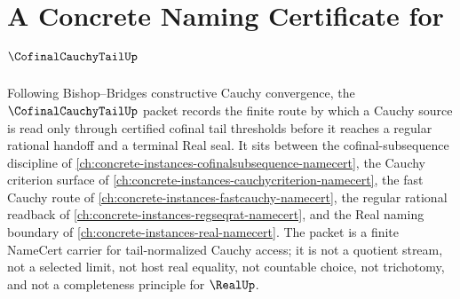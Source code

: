 \chapter{A Concrete Naming Certificate for $\CofinalCauchyTailUp$}
\label{ch:concrete-instances-cofinalcauchytail-namecert}

Following Bishop--Bridges constructive Cauchy convergence, the $\CofinalCauchyTailUp$ packet records the finite route by which a Cauchy source is read only through certified cofinal tail thresholds before it reaches a regular rational handoff and a terminal Real seal. It sits between the cofinal-subsequence discipline of \autoref{ch:concrete-instances-cofinalsubsequence-namecert}, the Cauchy criterion surface of \autoref{ch:concrete-instances-cauchycriterion-namecert}, the fast Cauchy route of \autoref{ch:concrete-instances-fastcauchy-namecert}, the regular rational readback of \autoref{ch:concrete-instances-regseqrat-namecert}, and the Real naming boundary of \autoref{ch:concrete-instances-real-namecert}. The packet is a finite NameCert carrier for tail-normalized Cauchy access; it is not a quotient stream, not a selected limit, not host real equality, not countable choice, not trichotomy, and not a completeness principle for $\RealUp$.

